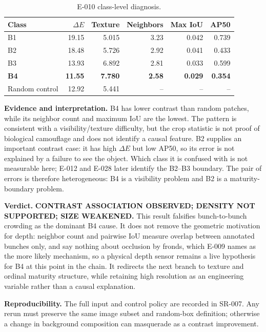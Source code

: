 \documentclass[preprint,12pt]{elsarticle}
\begin{document}
\begin{table}[H]
\centering
\caption{E-010 class-level diagnosis.}
\label{tab:e010}
\begin{tabular}{lrrrrr}
\toprule
Class & \(\Delta E\) & Texture & Neighbors & Max IoU & AP50\\
\midrule
B1 & 19.15 & 5.015 & 3.23 & 0.042 & 0.739\\
B2 & 18.48 & 5.726 & 2.92 & 0.041 & 0.433\\
B3 & 13.93 & 6.892 & 2.81 & 0.033 & 0.599\\
\textbf{B4} & \textbf{11.55} & \textbf{7.780} & \textbf{2.58} &
\textbf{0.029} & \textbf{0.354}\\
Random control & 12.92 & 5.441 & -- & -- & --\\
\bottomrule
\end{tabular}
\end{table}

\textbf{Evidence and interpretation.} B4 has lower contrast than random
patches, while its neighbor count and maximum IoU are the lowest. The pattern
is consistent with a visibility/texture difficulty, but the crop statistic is
not proof of biological camouflage and does not identify a causal feature. B2 supplies an important contrast case: it has
high \(\Delta E\) but low AP50, so its error is not explained by a failure to
see the object. Which class it is confused with is not measurable here; E-012
and E-028 later identify the B2--B3 boundary. The pair of errors is therefore
heterogeneous: B4 is a visibility problem and B2 is a maturity-boundary
problem.

\textbf{Verdict.} \textbf{CONTRAST ASSOCIATION OBSERVED; DENSITY NOT
SUPPORTED; SIZE WEAKENED.} This result falsifies bunch-to-bunch crowding as
the dominant B4 cause. It does not remove the geometric motivation for depth:
neighbor count and pairwise IoU measure overlap between annotated bunches
only, and say nothing about occlusion by fronds, which E-009 names as the more
likely mechanism, so a physical depth sensor remains a live hypothesis for B4
at this point in the chain. It redirects the next branch to texture and
ordinal maturity structure, while retaining high resolution as an engineering
variable rather than a causal explanation.

\textbf{Reproducibility.} The full input and control policy are recorded in
SR-007. Any rerun must preserve the same image subset and random-box
definition; otherwise a change in background composition can masquerade as a
contrast improvement.
\end{document}
